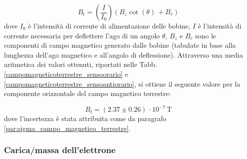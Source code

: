 \documentclass[]{article}
\begin{document}
    \begin{equation}
        \label{mag_terr}
        B_t= \left(\frac{I}{I_0}\right) (B_z \cot(\theta) \, + B_r)
    \end{equation}
    dove $ I_0 $ è l'intensità di corrente di alimentazione delle bobine, $ I $ è l'intensità di corrente necessaria per deflettere l'ago di un angolo $ \theta $, $B_z$ e $B_r$ sono le componenti di campo magnetico generato dalle bobine (tabulate in base alla lunghezza dell'ago magnetico e all'angolo di deflessione). Attraverso una media aritmetica dei valori ottenuti, riportati nelle Tabb. \ref{campomagneticoterrestre_sensoorario} e \ref{campomagneticoterrestre_sensoantiorario}, si ottiene il seguente valore per la componente orizzontale del campo magnetico terrestre:

    
    \begin{equation}
        \label{misura_campomagneticoterrestre}
        B_t = ( 2.37\pm 0.26) \, \cdot 10^{-7} \, \text{T}
    \end{equation}
    dove l'incertezza è stata attribuita come da paragrafo \ref{par:sigma_campo_magnetico_terrestre}. \\
    \label{par:campo_magnetico_terrestre}

    \subsubsection{Carica/massa dell'elettrone}
\end{document}
